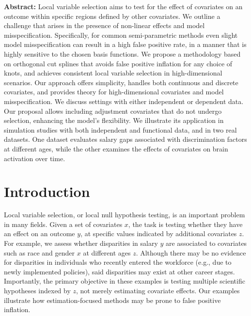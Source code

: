 \textbf{Abstract:} Local variable selection aims to  test for the effect of covariates on an outcome within specific regions defined by other covariates. We outline a challenge that arises in the presence of non-linear effects and model misspecification. Specifically, for common semi-parametric methods even slight model misspecification can result in a high false positive rate, in a manner that is highly sensitive to the chosen basis functions. We propose a methodology based on orthogonal cut splines that avoids false positive inflation for any choice of knots,  and achieves consistent local variable selection in high-dimensional scenarios. Our approach offers simplicity, handles both continuous and discrete covariates, and provides theory for high-dimensional covariates and model misspecification. We discuss settings with either independent or dependent data. Our proposal allows including adjustment covariates that do not undergo selection, enhancing the model's flexibility. We illustrate its application in simulation studies with both independent and functional data, and in two real datasets. One dataset evaluates salary gaps associated with discrimination factors at different ages, while the other examines the effects of covariates on brain activation over time.

\section{Introduction}

Local variable selection, or local null hypothesis testing,  is an important problem in many fields. Given  a set of covariates $x$, the task is testing whether they have an effect on an outcome $y$, at specific values indicated by additional covariates $z$.  For example, we assess whether
disparities in salary $y$ are associated to covariates such as race and gender $x$ at different ages $z$. Although there may be no evidence for disparities in individuals who recently entered the workforce (e.g., due to newly implemented policies), said disparities may exist at other career stages. 
Importantly, the primary objective in these examples is testing multiple scientific hypotheses indexed by $z$, not merely estimating covariate effects.  Our examples illustrate how estimation-focused methods may be prone to false positive inflation.  

